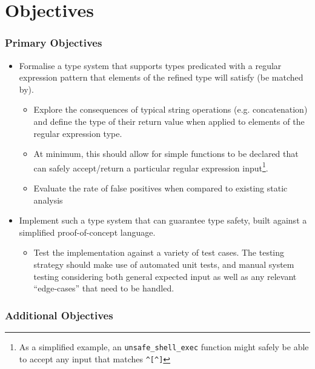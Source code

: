 \documentclass[a4paper,openany,12pt]{book}
\begin{document}
\section*{Objectives}



\subsubsection*{Primary Objectives}

\begin{itemize}
    \item Formalise a type system that supports types predicated with a regular expression pattern that elements of the refined type will satisfy (be matched by).
    
    \begin{itemize}
        \item Explore the consequences of typical string operations (e.g. concatenation) and define the type of their return value when applied to elements of the regular expression type.
        
        \item At minimum, this should allow for simple functions to be declared that can safely accept/return a particular regular expression input\footnote{As a simplified example, an \texttt{unsafe\_shell\_exec} function might safely be able to accept any input that matches \texttt{\textasciicircum{}[\textasciicircum{}\textasciigrave{}]\textdollar{}}}.
        
        \item Evaluate the rate of false positives when compared to existing static analysis 
    \end{itemize}
    
    \item Implement such a type system that can guarantee type safety, built against a simplified proof-of-concept language.
    \begin{itemize}
        \item Test the implementation against a variety of test cases. The testing strategy should make use of automated unit tests, and manual system testing considering both general expected input as well as any relevant ``edge-cases'' that need to be handled.
    \end{itemize}
\end{itemize}

\subsubsection*{Additional Objectives}
\end{document}
